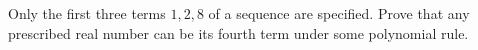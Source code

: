 Only the first three terms $ 1,2,8 $ of a sequence are specified. Prove that any prescribed real number can be its fourth term under some polynomial rule.

